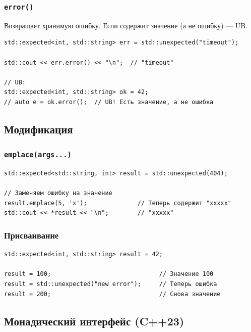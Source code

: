 \documentclass[a4paper,12pt]{article}
\begin{document}
\subsubsection{\texttt{error()}}

Возвращает хранимую ошибку. Если содержит значение (а не ошибку) --- UB.

\begin{lstlisting}
std::expected<int, std::string> err = std::unexpected("timeout");

std::cout << err.error() << "\n";  // "timeout"

// UB:
std::expected<int, std::string> ok = 42;
// auto e = ok.error();  // UB! Есть значение, а не ошибка
\end{lstlisting}

\subsection{Модификация}

\subsubsection{\texttt{emplace(args...)}}

\begin{lstlisting}
std::expected<std::string, int> result = std::unexpected(404);

// Заменяем ошибку на значение
result.emplace(5, 'x');              // Теперь содержит "xxxxx"
std::cout << *result << "\n";        // "xxxxx"
\end{lstlisting}

\subsubsection{Присваивание}

\begin{lstlisting}
std::expected<int, std::string> result = 42;

result = 100;                              // Значение 100
result = std::unexpected("new error");     // Теперь ошибка
result = 200;                              // Снова значение
\end{lstlisting}

\subsection{Монадический интерфейс (C++23)}
\end{document}
